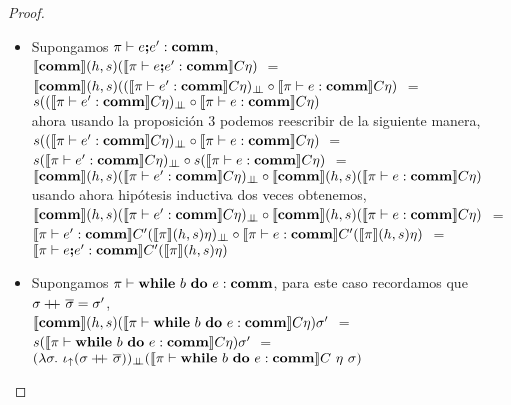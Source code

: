 \begin{proof}
\begin{itemize}
\begin{itemize}
\item Supongamos $\pi \vdash e \textbf{;} e' : \textbf{comm}$,\\

$\llbracket \textbf{comm} \rrbracket(h,s)(\llbracket \pi \vdash e \textbf{;} e' : \textbf{comm} \rrbracket C\eta)$ $=$\\
$\llbracket \textbf{comm} \rrbracket(h,s)
	((\llbracket \pi \vdash e' : \textbf{comm} \rrbracket C\eta)_{\bot \!\!\! \bot} 
	\circ
	\llbracket \pi \vdash e : \textbf{comm} \rrbracket C\eta
	)$ $=$ \\
$s((\llbracket \pi \vdash e' : \textbf{comm} \rrbracket C\eta)_{\bot \!\!\! \bot} 
	\circ
	\llbracket \pi \vdash e : \textbf{comm} \rrbracket C\eta
	)$\\

ahora usando la proposici\'on 3 podemos reescribir de la siguiente manera,\\

$s((\llbracket \pi \vdash e' : \textbf{comm} \rrbracket C\eta)_{\bot \!\!\! \bot} 
	\circ
	\llbracket \pi \vdash e : \textbf{comm} \rrbracket C\eta
	)$ $=$\\
$s(\llbracket \pi \vdash e' : \textbf{comm} \rrbracket C\eta)_{\bot \!\!\! \bot} 
	\circ
	s(\llbracket \pi \vdash e : \textbf{comm} \rrbracket C\eta)$ $=$\\
$\llbracket \textbf{comm} \rrbracket(h,s)(\llbracket \pi \vdash e' : \textbf{comm} \rrbracket C\eta)_{\bot \!\!\! \bot} 
	\circ
 \llbracket \textbf{comm} \rrbracket(h,s)(\llbracket \pi \vdash e : \textbf{comm} \rrbracket C\eta)$\\

usando ahora hip\'otesis inductiva dos veces obtenemos,\\

$\llbracket \textbf{comm} \rrbracket(h,s)(\llbracket \pi \vdash e' : \textbf{comm} \rrbracket C\eta)_{\bot \!\!\! \bot} 
	\circ
 \llbracket \textbf{comm} \rrbracket(h,s)(\llbracket \pi \vdash e : \textbf{comm} \rrbracket C\eta)$ $=$\\
$\llbracket \pi \vdash e' : \textbf{comm} \rrbracket C'(\llbracket \pi \rrbracket(h,s)\eta)_{\bot \!\!\! \bot}
	\circ
\llbracket \pi \vdash e : \textbf{comm} \rrbracket C'(\llbracket \pi \rrbracket(h,s)\eta)$ $=$\\
$\llbracket \pi \vdash e \textbf{;} e' : \textbf{comm} \rrbracket C'(\llbracket \pi \rrbracket(h,s)\eta)$\\

\item Supongamos $\pi \vdash \textbf{while} \ b \ \textbf{do} \ e : \textbf{comm}$, para este caso
recordamos que $\sigma +\kern-1.3ex+\kern0.8ex \overline{\sigma} = \sigma'$,\\

$\llbracket \textbf{comm} \rrbracket(h,s)(\llbracket \pi \vdash \textbf{while} \ b \ \textbf{do} \ e : \textbf{comm} \rrbracket C\eta)\sigma'$ $=$\\
$s(\llbracket \pi \vdash \textbf{while} \ b \ \textbf{do} \ e : \textbf{comm} \rrbracket C\eta)\sigma'$ $=$\\
$(\lambda \sigma. \ \iota_{\uparrow} (\sigma +\kern-1.3ex+\kern0.8ex \overline{\sigma}))_{\bot \!\!\! \bot}
				(\llbracket \pi \vdash \textbf{while} \ b \ \textbf{do} \ e : \textbf{comm} \rrbracket C \ \eta \ \sigma)$\\


\end{itemize}
\end{itemize}
\end{proof}
